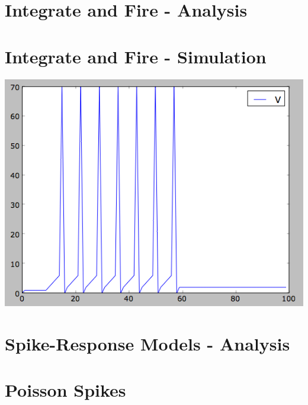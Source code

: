 \documentclass[12pt]{article}
\begin{document}
\maketitle

\section{Integrate and Fire - Analysis}



\section{Integrate and Fire - Simulation}

\includegraphics[scale=0.71]{integratefirespikes.png}

\section{Spike-Response Models - Analysis}



\section{Poisson Spikes}
\end{document}
